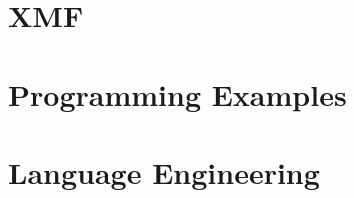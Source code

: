 \documentclass[a4paper,pdftex,12pt]{scrbook}
\begin{document}
\tableofcontents

\mainmatter



\part{XMF}





\part{Programming Examples}





\part{Language Engineering}
















\appendices
{}



\backmatter
%
%
\end{document}
